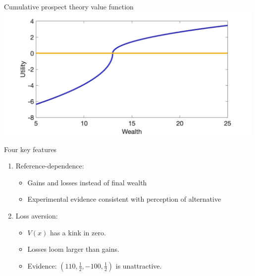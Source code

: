 \documentclass[11pt, aspectratio=169]{beamer}
\begin{document}
\begin{frame}{Cumulative prospect theory value function}
\centering
\includegraphics[width= 0.99\textwidth]{cpt_utility}
\end{frame}


\begin{frame}{Four key features}
    \begin{enumerate}[1.]
        \item Reference-dependence:\bigskip
            \begin{itemize}
                \item Gains and losses instead of final wealth\medskip
                \item Experimental evidence consistent with perception of alternative\medskip
            \end{itemize}\bigskip
        \item Loss aversion:\bigskip
            \begin{itemize}
                \item $V(x)$ has a kink in zero.\medskip
                \item Losses loom larger than gains.\medskip
                \item Evidence: $(110,\frac{1}{2},-100,\frac{1}{2})$ is unattractive.
            \end{itemize}
    \end{enumerate}
\end{frame}
\end{document}

